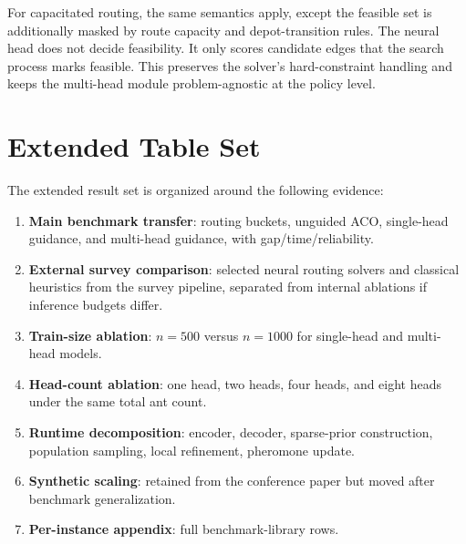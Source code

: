 \documentclass[11pt]{article}
\begin{document}
For capacitated routing, the same semantics apply, except the feasible set is additionally masked by route capacity and depot-transition rules.
The neural head does not decide feasibility.
It only scores candidate edges that the search process marks feasible.
This preserves the solver's hard-constraint handling and keeps the multi-head module problem-agnostic at the policy level.

\section{Extended Table Set}
\label{app:target-tables}

The extended result set is organized around the following evidence:
\begin{enumerate}
    \item \textbf{Main benchmark transfer}: routing buckets, unguided ACO, single-head guidance, and multi-head guidance, with gap/time/reliability.
    \item \textbf{External survey comparison}: selected neural routing solvers and classical heuristics from the survey pipeline, separated from internal ablations if inference budgets differ.
    \item \textbf{Train-size ablation}: $n=500$ versus $n=1000$ for single-head and multi-head models.
    \item \textbf{Head-count ablation}: one head, two heads, four heads, and eight heads under the same total ant count.
    \item \textbf{Runtime decomposition}: encoder, decoder, sparse-prior construction, population sampling, local refinement, pheromone update.
    \item \textbf{Synthetic scaling}: retained from the conference paper but moved after benchmark generalization.
    \item \textbf{Per-instance appendix}: full benchmark-library rows.
\end{enumerate}
\end{document}
